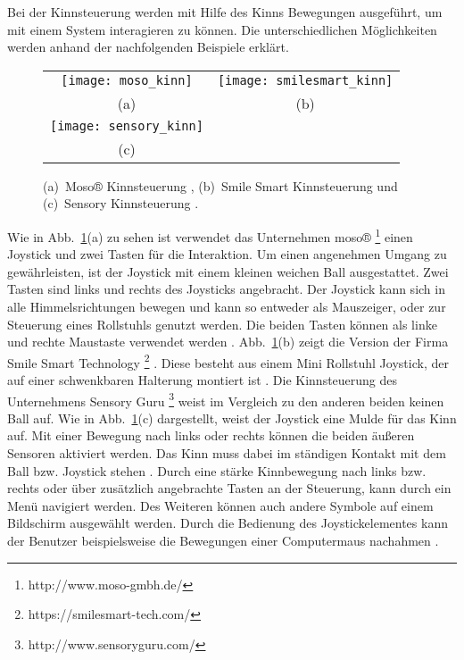 Bei der Kinnsteuerung werden mit Hilfe des Kinns Bewegungen ausgeführt, um mit einem System interagieren zu können. Die unterschiedlichen Möglichkeiten werden anhand der nachfolgenden Beispiele erklärt.
%
\begin{figure}
\centering\small
\setlength{\tabcolsep}{0mm}	%
\begin{tabular}{c@{\hspace{15mm}}c} %
  \texttt{[image: moso\_kinn]} &
  \texttt{[image: smilesmart\_kinn]}
\\
  (a) & (b)
\\[5pt]	%
  \texttt{[image: sensory\_kinn]}
\\
  (c)
\end{tabular}
%
\caption{(a)~Moso® Kinnsteuerung \cite{MOSO}, (b)~Smile Smart Kinnsteuerung \cite{SMILESMART} und (c)~Sensory Kinnsteuerung \cite{SENSORY}.}
\label{fig:kinn}
\end{figure}
\newline \newline
Wie in Abb.~\ref{fig:kinn}(a) zu sehen ist verwendet das Unternehmen moso® %
\footnote{http://www.moso-gmbh.de/}
%
einen Joystick und zwei Tasten für die Interaktion. Um einen angenehmen Umgang zu gewährleisten, ist der Joystick mit einem kleinen weichen Ball ausgestattet. Zwei Tasten sind links und rechts des Joysticks angebracht. Der Joystick kann sich in alle Himmelsrichtungen bewegen und kann so entweder als Mauszeiger, oder zur Steuerung eines Rollstuhls genutzt werden. Die beiden Tasten können als linke und rechte Maustaste verwendet werden \cite{MOSO}.
\newline
Abb.~\ref{fig:kinn}(b) zeigt die Version der Firma Smile Smart Technology%
\footnote{https://smilesmart-tech.com/}
%
. Diese besteht aus einem Mini Rollstuhl Joystick, der auf einer schwenkbaren Halterung montiert ist \cite{SMILESMART}.
\newline
Die Kinnsteuerung des Unternehmens Sensory Guru%
\footnote{http://www.sensoryguru.com/}
%
weist im Vergleich zu den anderen beiden keinen Ball auf. Wie in Abb.~\ref{fig:kinn}(c) dargestellt, weist der Joystick eine Mulde für das Kinn auf. Mit einer Bewegung nach links oder rechts können die beiden äußeren Sensoren aktiviert werden. Das Kinn muss dabei im ständigen Kontakt mit dem Ball bzw. Joystick stehen \cite{SENSORY}. 
\newline
Durch eine stärke Kinnbewegung nach links bzw. rechts oder über zusätzlich angebrachte Tasten an der Steuerung, kann durch ein Menü navigiert werden. Des Weiteren können auch andere Symbole auf einem Bildschirm ausgewählt werden. Durch die Bedienung des Joystickelementes kann der Benutzer beispielsweise die Bewegungen einer Computermaus nachahmen \cite{MOSO} \cite{SENSORY}. 
